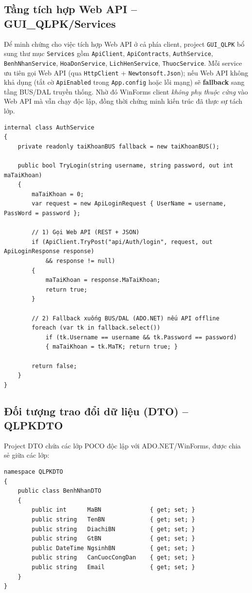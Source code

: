 \documentclass[12pt,a4paper]{report}
\begin{document}
\subsection{Tầng tích hợp Web API -- GUI\_QLPK/Services}

Để minh chứng cho việc tích hợp Web API ở cả phía client, project \texttt{GUI\_QLPK} bổ sung thư mục \texttt{Services} gồm \texttt{ApiClient}, \texttt{ApiContracts}, \texttt{AuthService}, \texttt{BenhNhanService}, \texttt{HoaDonService}, \texttt{LichHenService}, \texttt{ThuocService}. Mỗi service ưu tiên gọi Web API (qua \texttt{HttpClient} + \texttt{Newtonsoft.Json}); nếu Web API không khả dụng (tắt cờ \texttt{ApiEnabled} trong \texttt{App.config} hoặc lỗi mạng) sẽ \textbf{fallback} sang tầng BUS/DAL truyền thống. Nhờ đó WinForms client \emph{không phụ thuộc cứng} vào Web API mà vẫn chạy độc lập, đồng thời chứng minh kiến trúc đã thực sự tách lớp.

\begin{lstlisting}[style=csharp,caption={GUI\_QLPK/Services/AuthService.cs -- gọi Web API có fallback}]
internal class AuthService
{
    private readonly taiKhoanBUS fallback = new taiKhoanBUS();

    public bool TryLogin(string username, string password, out int maTaiKhoan)
    {
        maTaiKhoan = 0;
        var request = new ApiLoginRequest { UserName = username, PassWord = password };

        // 1) Gọi Web API (REST + JSON)
        if (ApiClient.TryPost("api/Auth/login", request, out ApiLoginResponse response)
            && response != null)
        {
            maTaiKhoan = response.MaTaiKhoan;
            return true;
        }

        // 2) Fallback xuống BUS/DAL (ADO.NET) nếu API offline
        foreach (var tk in fallback.select())
            if (tk.Username == username && tk.Password == password)
            { maTaiKhoan = tk.MaTK; return true; }

        return false;
    }
}
\end{lstlisting}

\subsection{Đối tượng trao đổi dữ liệu (DTO) -- QLPKDTO}

Project DTO chứa các lớp POCO độc lập với ADO.NET/WinForms, được chia sẻ giữa các lớp:

\begin{lstlisting}[style=csharp,caption={DTO -- BenhNhanDTO}]
namespace QLPKDTO
{
    public class BenhNhanDTO
    {
        public int      MaBN              { get; set; }
        public string   TenBN             { get; set; }
        public string   DiachiBN          { get; set; }
        public string   GtBN              { get; set; }
        public DateTime NgsinhBN          { get; set; }
        public string   CanCuocCongDan    { get; set; }
        public string   Email             { get; set; }
    }
}
\end{lstlisting}
\end{document}
